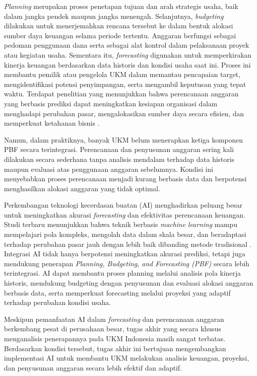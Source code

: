 \textit{Planning} merupakan proses penetapan tujuan dan arah strategis usaha, baik dalam jangka pendek maupun jangka menengah. Selanjutnya, \textit{budgeting} dilakukan untuk menerjemahkan rencana tersebut ke dalam bentuk alokasi sumber daya keuangan selama periode tertentu. Anggaran berfungsi sebagai pedoman penggunaan dana serta sebagai alat kontrol dalam pelaksanaan proyek atau kegiatan usaha. Sementara itu, \textit{forecasting} digunakan untuk memperkirakan kinerja keuangan berdasarkan data historis dan kondisi usaha saat ini. Proses ini membantu pemilik atau pengelola UKM dalam memantau pencapaian target, mengidentifikasi potensi penyimpangan, serta mengambil keputusan yang tepat waktu.  Terdapat penelitian yang menunjukkan bahwa perencanaan anggaran yang berbasis prediksi dapat meningkatkan kesiapan organisasi dalam menghadapi perubahan pasar, mengalokasikan sumber daya secara efisien, dan memperkuat ketahanan bisnis \autocite{hariharan2018}.

Namun, dalam praktiknya, banyak UKM belum menerapkan ketiga komponen PBF secara terintegrasi. Perencanaan dan penyusunan anggaran sering kali dilakukan secara sederhana tanpa analisis mendalam terhadap data historis maupun evaluasi atas penggunaan anggaran sebelumnya. Kondisi ini menyebabkan proses perencanaan menjadi kurang berbasis data dan berpotensi menghasilkan alokasi anggaran yang tidak optimal.

Perkembangan teknologi kecerdasan buatan (AI) menghadirkan peluang besar untuk meningkatkan akurasi \textit{forecasting} dan efektivitas perencanaan keuangan. Studi terbaru menunjukkan bahwa teknik berbasis \textit{machine learning} mampu mempelajari pola kompleks, mengolah data dalam skala besar, dan beradaptasi terhadap perubahan pasar jauh dengan lebih baik dibanding metode tradisional \autocite{wasserbacher2022}. Integrasi AI tidak hanya berpotensi meningkatkan akurasi prediksi, tetapi juga mendukung penerapan \textit{Planning, Budgeting, and Forecasting (PBF)} secara lebih terintegrasi. AI dapat membantu proses planning melalui analisis pola kinerja historis, mendukung budgeting dengan penyusunan dan evaluasi alokasi anggaran berbasis data, serta memperkuat forecasting melalui proyeksi yang adaptif terhadap perubahan kondisi usaha.

Meskipun pemanfaatan AI dalam \textit{forecasting} dan perencanaan anggaran berkembang pesat di perusahaan besar, tugas akhir yang secara khusus menganalisis penerapannya pada UKM Indonesia masih sangat terbatas. Berdasarkan kondisi tersebut, tugas akhir ini bertujuan mengembangkan implementasi AI untuk membantu UKM melakukan analisis keuangan, proyeksi, dan penyusunan anggaran secara lebih efektif dan adaptif.
